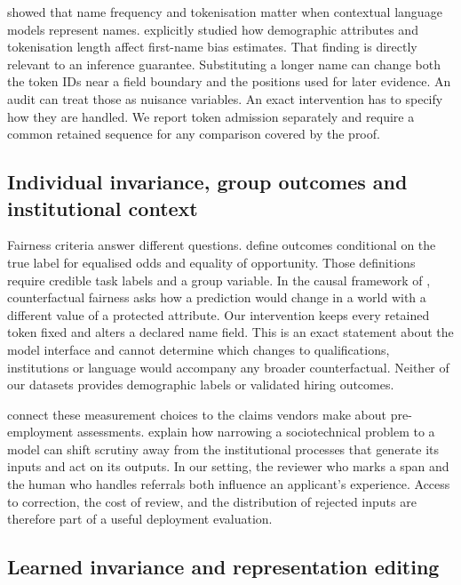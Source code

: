 \citet{wolfe2021} showed that name frequency and tokenisation matter when contextual language models represent names. \citet{an2023} explicitly studied how demographic attributes and tokenisation length affect first-name bias estimates. That finding is directly relevant to an inference guarantee. Substituting a longer name can change both the token IDs near a field boundary and the positions used for later evidence. An audit can treat those as nuisance variables. An exact intervention has to specify how they are handled. We report token admission separately and require a common retained sequence for any comparison covered by the proof.

\subsection{Individual invariance, group outcomes and institutional context}

Fairness criteria answer different questions. \citet{hardt2016} define outcomes conditional on the true label for equalised odds and equality of opportunity. Those definitions require credible task labels and a group variable. In the causal framework of \citet{kusner2017}, counterfactual fairness asks how a prediction would change in a world with a different value of a protected attribute. Our intervention keeps every retained token fixed and alters a declared name field. This is an exact statement about the model interface and cannot determine which changes to qualifications, institutions or language would accompany any broader counterfactual. Neither of our datasets provides demographic labels or validated hiring outcomes.

\citet{raghavan2020} connect these measurement choices to the claims vendors make about pre-employment assessments. \citet{selbst2019} explain how narrowing a sociotechnical problem to a model can shift scrutiny away from the institutional processes that generate its inputs and act on its outputs. In our setting, the reviewer who marks a span and the human who handles referrals both influence an applicant's experience. Access to correction, the cost of review, and the distribution of rejected inputs are therefore part of a useful deployment evaluation.

\subsection{Learned invariance and representation editing}

